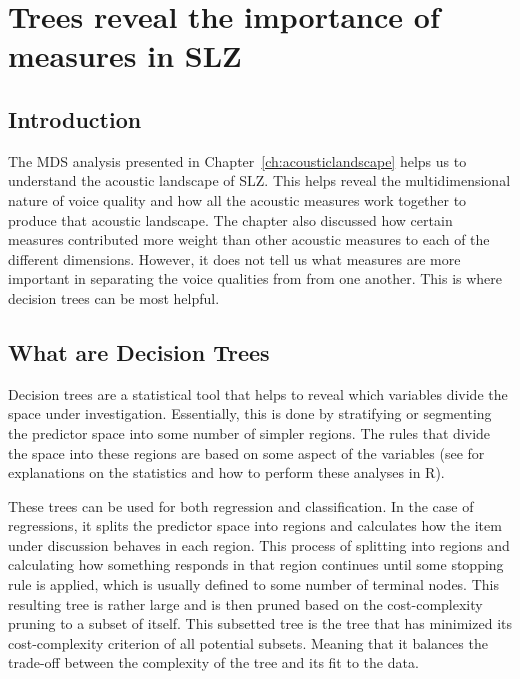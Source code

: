 \chapter{Trees reveal the importance of measures in SLZ} \label{ch:bagging}

\section{Introduction} \label{sec:bagging_intro}

The MDS analysis presented in Chapter~\ref{ch:acousticlandscape} helps us to understand the acoustic landscape of SLZ. This helps reveal the multidimensional nature of voice quality and how all the acoustic measures work together to produce that acoustic landscape. The chapter also discussed how certain measures contributed more weight than other acoustic measures to each of the different dimensions. However, it does not tell us what measures are more important in separating the voice qualities from from one another. This is where decision trees can be most helpful.

\section{What are Decision Trees} \label{sec:bagging_what}

Decision trees are a statistical tool that helps to reveal which variables divide the space under investigation. Essentially, this is done by stratifying or segmenting the predictor space into some number of simpler regions. The rules that divide the space into these regions are based on some aspect of the variables (see \cite{hastieElementsStatisticalLearning2009,jamesIntroductionStatisticalLearning2021} for explanations on the statistics and how to perform these analyses in R). 

These trees can be used for both regression and classification. In the case of regressions, it splits the predictor space into regions and calculates how the item under discussion behaves in each region. This process of splitting into regions and calculating how something responds in that region continues until some stopping rule is applied, which is usually defined to some number of terminal nodes. This resulting tree is rather large and is then pruned based on the cost-complexity pruning to a subset of itself. This subsetted tree is the tree that has minimized its cost-complexity criterion of all potential subsets. Meaning that it balances the trade-off between the complexity of the tree and its fit to the data. 

